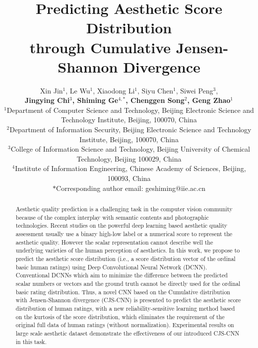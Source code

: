 \documentclass[letterpaper]{article} %
\begin{document}
\title{Predicting Aesthetic Score Distribution \\ through Cumulative Jensen-Shannon Divergence}
\author{Xin Jin$^1$, Le Wu$^1$, Xiaodong Li$^1$, Siyu Chen$^1$, Siwei Peng$^3$,\\ \Large{\textbf{ Jingying Chi$^3$, Shiming Ge$^{4,*}$, Chenggen Song$^2$, Geng Zhao$^1$}}\\
$^1$Department of Computer Science and Technology,
Beijing Electronic Science and Technology Institute, Beijing, 100070, China
\\
$^2$Department of Information Security,
Beijing Electronic Science and Technology Institute, Beijing, 100070, China
\\
$^3$College of Information Science and Technology, Beijing University of Chemical Technology, Beijing 100029, China
\\
$^4$Institute of Information Engineering, Chinese Academy of Sciences, Beijing, 100093, China
\\
$*$Corresponding author email: geshiming@iie.ac.cn\\
}
\maketitle
\begin{abstract}
Aesthetic quality prediction is a challenging task in the computer vision community because of the complex interplay with semantic contents and photographic technologies. Recent studies on the powerful deep learning based aesthetic quality assessment usually use a binary high-low label or a numerical score to represent the aesthetic quality. However the scalar representation cannot describe well the underlying varieties of the human perception of aesthetics. In this work, we propose to predict the aesthetic score distribution (i.e., a score distribution vector of the ordinal basic human ratings) using Deep Convolutional Neural Network (DCNN). Conventional DCNNs which aim to minimize the difference between the predicted scalar numbers or vectors and the ground truth cannot be directly used for the ordinal basic rating distribution. Thus, a novel CNN based on the Cumulative distribution with Jensen-Shannon divergence (CJS-CNN) is presented to predict the aesthetic score distribution of human ratings, with a new reliability-sensitive learning method based on the kurtosis of the score distribution, which eliminates the requirement of the original full data of human ratings (without normalization). Experimental results on large scale aesthetic dataset demonstrate the effectiveness of our introduced CJS-CNN in this task.
\end{abstract}
\end{document}
